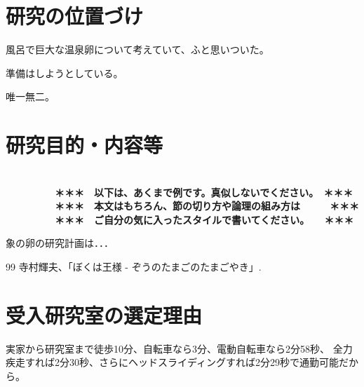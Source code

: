 \documentclass[11pt,a4j,dvipdfmx]{jarticle} 					%
\newcommand{\研究課題名}{象の卵}
\newcommand{\研究機関名}{逢坂大学}
\newcommand{\研究代表者氏名}{湯川秀樹}
\begin{document}

\section{研究の位置づけ}

		風呂で巨大な温泉卵について考えていて、ふと思いついた。

	準備はしようとしている。

	唯一無二。




\section{研究目的・内容等}

\JSPSInstructions		%
\textbf{\\　　　　　＊＊＊　以下は、あくまで例です。真似しないでください。　＊＊＊\\
　　　　　＊＊＊　本文はもちろん、節の切り方や論理の組み方は　　　＊＊＊\\
　　　　　＊＊＊　ご自分の気に入ったスタイルで書いてください。　　＊＊＊}

	象の卵の研究計画は．．．

	\vspace{1cm}
	\begin{thebibliography}{99}
		 寺村輝夫、「ぼくは王様 - ぞうのたまごのたまごやき」.
	\end{thebibliography}



\section{受入研究室の選定理由}

	実家から研究室まで徒歩10分、自転車なら3分、電動自転車なら2分58秒、
	全力疾走すれば2分30秒、さらにヘッドスライディングすれば2分29秒で通勤可能だから。
\end{document}
